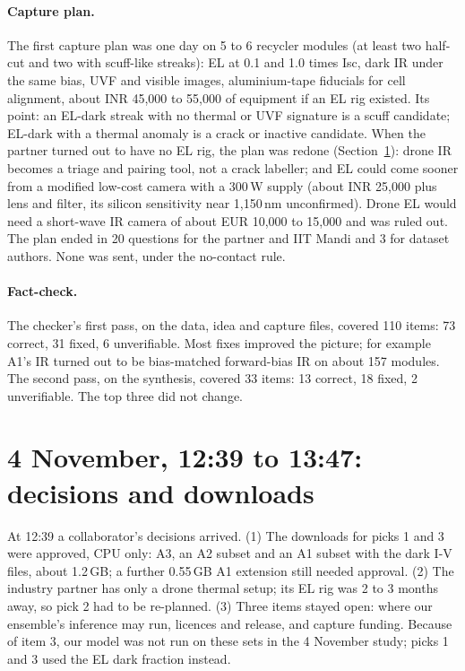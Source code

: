 \paragraph{Capture plan.} The first capture plan was one day on 5 to 6 recycler modules (at least two half-cut and two with
scuff-like streaks): EL at 0.1 and 1.0 times Isc, dark IR under the same bias, UVF and visible images, aluminium-tape fiducials for
cell alignment, about INR 45,000 to 55,000 of equipment if an EL rig existed. Its point: an EL-dark streak with no thermal or UVF
signature is a scuff candidate; EL-dark with a thermal anomaly is a crack or inactive candidate. When the partner turned out to have
no EL rig, the plan was redone (Section~\ref{sec:thermal-decisions}): drone IR becomes a triage and pairing tool, not a crack
labeller; and EL could come sooner from a modified low-cost camera with a 300\,W supply (about INR 25,000 plus lens and filter, its
silicon sensitivity near 1,150\,nm unconfirmed). Drone EL would need a short-wave IR camera of about EUR 10,000 to 15,000 and was
ruled out. The plan ended in 20 questions for the partner and IIT Mandi and 3 for dataset authors. None was sent, under the
no-contact rule.

\paragraph{Fact-check.} The checker's first pass, on the data, idea and capture files, covered 110 items: 73 correct, 31 fixed,
6 unverifiable. Most fixes improved the picture; for example A1's IR turned out to be bias-matched forward-bias IR on about 157
modules. The second pass, on the synthesis, covered 33 items: 13 correct, 18 fixed, 2 unverifiable. The top three did not change.

\section{4 November, 12:39 to 13:47: decisions and downloads}\label{sec:thermal-decisions}

At 12:39 a collaborator's decisions arrived. (1) The downloads for picks 1 and 3 were approved, CPU only: A3, an A2 subset
and an A1 subset with the dark I-V files, about 1.2\,GB; a further 0.55\,GB A1 extension still needed approval. (2) The industry
partner has only a drone thermal setup; its EL rig was 2 to 3 months away, so pick 2 had to be re-planned. (3) Three items stayed
open: where our ensemble's inference may run, licences and release, and capture funding. Because of item 3, our model was not run on
these sets in the 4 November study; picks 1 and 3 used the EL dark fraction instead.

